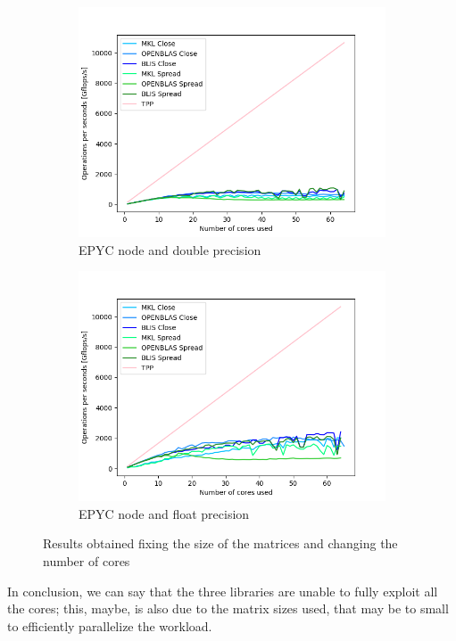 \documentclass[12pt]{article}
\begin{document}
\begin{figure}[h]
            \begin{subfigure}[b]{0.4\textwidth}
                \includegraphics[width = \textwidth]{figs2/fixed_matrix_EPYC_d.png}
                \caption{EPYC node and double precision}
                \label{fig:fixed_matrix_epyc_d}
            \end{subfigure}
            \begin{subfigure}[b]{0.4\textwidth}
                \includegraphics[width = \textwidth]{figs2/fixed_matrix_EPYC_f.png}
                \caption{EPYC node and float precision}
                \label{fig:fixed_matrix_epyc_f}
            \end{subfigure}
            \caption{Results obtained fixing the size of the matrices and changing the number of cores}
            \label{fig:fixed_matrix}
        \end{figure}

		In conclusion, we can say that the three libraries are unable to fully exploit all the cores; this, maybe, is also due to the matrix sizes used, that may be to small to efficiently parallelize the workload.
\end{document}
